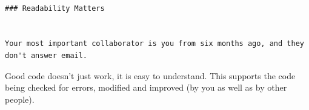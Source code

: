 \documentclass[]{book}
\begin{document}
\begin{verbatim}
                                                                                                                                                                                                                                                          ### Readability Matters
                                                                                                                                                                                                                                                          
                                                                                                                                                                                                                                                          Your most important collaborator is you from six months ago, and they don't answer email.
\end{verbatim}

Good code doesn't just work, it is easy to understand. This supports the
code being checked for errors, modified and improved (by you as well as
by other people).
\end{document}
